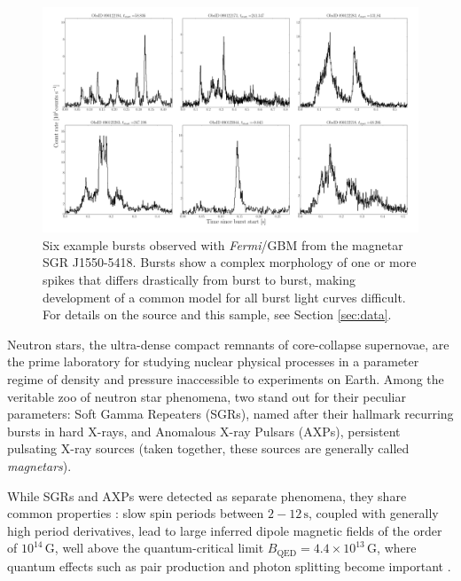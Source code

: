 \documentclass[12pt]{emulateapj}
\newcommand{\project}[1]{\textsl{#1}}
\newcommand{\fermi}{\project{Fermi}}
\begin{document}
\begin{figure}[h]
\begin{center}
\includegraphics[width=18cm]{example_bursts.pdf}
\caption{Six example bursts observed with \fermi/GBM from the magnetar SGR J1550-5418. Bursts show a complex morphology of one or more
spikes that differs drastically from burst to burst, making development of a common model for all burst light curves difficult. For details on the source
and this sample, see Section \ref{sec:data}.}
\label{fig:example_bursts}
\end{center}
\end{figure}


Neutron stars, the ultra-dense compact remnants of core-collapse supernovae, are the prime laboratory for studying nuclear 
physical processes in a parameter regime of density and pressure inaccessible to experiments on Earth. 
Among the veritable zoo of neutron star phenomena, two stand out for their peculiar parameters: Soft Gamma Repeaters (SGRs),
named after their hallmark recurring bursts in hard X-rays, and Anomalous X-ray Pulsars (AXPs), persistent pulsating X-ray
sources (taken together, these sources are generally called {\it magnetars}). 

While SGRs and AXPs were detected as separate phenomena, they share common properties \citep[for general overviews of both phenomena, see ][]{woods2006,mereghetti2011}: slow spin periods between
$2 - 12 \, \mathrm{s}$, coupled with generally high period derivatives, lead to large inferred dipole magnetic fields of
the order of $10^{14} \, \mathrm{G}$, well above the quantum-critical limit $B_{\mathrm{QED}} = 4.4 \times 10^{13} \, \mathrm{G}$,
where quantum effects such as pair production and photon splitting become important \citep[although three sources have been 
identified with properties similar to magnetars, but inferred dipole fields below this limit;][]{vanderhorst2010,esposito2010,rea2010,rea2012,scholz2012,rea2014}. 
\end{document}
